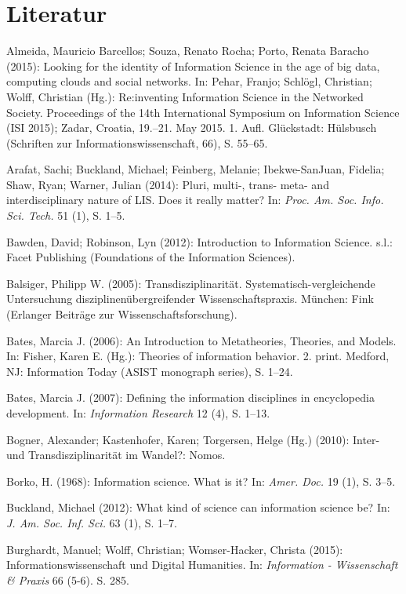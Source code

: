 \documentclass[a4paper,
fontsize=11pt,
oneside,
numbers=noperiodatend,
parskip=half-,
bibliography=totoc,
final
]{scrartcl}
\begin{document}
\section*{Literatur}\label{literatur}

Almeida, Mauricio Barcellos; Souza, Renato Rocha; Porto, Renata Baracho
(2015): Looking for the identity of Information Science in the age of
big data, computing clouds and social networks. In: Pehar, Franjo;
Schlögl, Christian; Wolff, Christian (Hg.): Re:inventing Information
Science in the Networked Society. Proceedings of the 14th International
Symposium on Information Science (ISI 2015); Zadar, Croatia, 19.--21.
May 2015. 1. Aufl. Glückstadt: Hülsbusch (Schriften zur
Informationswissenschaft, 66), S. 55--65.

Arafat, Sachi; Buckland, Michael; Feinberg, Melanie; Ibekwe-SanJuan,
Fidelia; Shaw, Ryan; Warner, Julian (2014): Pluri, multi-, trans- meta-
and interdisciplinary nature of LIS. Does it really matter? In:
\emph{Proc. Am. Soc. Info. Sci. Tech.} 51 (1), S. 1--5.

Bawden, David; Robinson, Lyn (2012): Introduction to Information
Science. s.l.: Facet Publishing (Foundations of the Information
Sciences).

Balsiger, Philipp W. (2005): Transdisziplinarität.
Systematisch-vergleichende Untersuchung disziplinenübergreifender
Wissenschaftspraxis. München: Fink (Erlanger Beiträge zur
Wissenschaftsforschung).

Bates, Marcia J. (2006): An Introduction to Metatheories, Theories, and
Models. In: Fisher, Karen E. (Hg.): Theories of information behavior. 2.
print. Medford, NJ: Information Today (ASIST monograph series), S.
1--24.

Bates, Marcia J. (2007): Defining the information disciplines in
encyclopedia development. In: \emph{Information Research} 12 (4), S.
1--13.

Bogner, Alexander; Kastenhofer, Karen; Torgersen, Helge (Hg.) (2010):
Inter- und Transdisziplinarität im Wandel?: Nomos.

Borko, H. (1968): Information science. What is it? In: \emph{Amer. Doc.}
19 (1), S. 3--5.

Buckland, Michael (2012): What kind of science can information science
be? In: \emph{J. Am. Soc. Inf. Sci.} 63 (1), S. 1--7.

Burghardt, Manuel; Wolff, Christian; Womser-Hacker, Christa (2015):
Informationswissenschaft und Digital Humanities. In: \emph{Information -
Wissenschaft \& Praxis} 66 (5-6). S. 285.
\end{document}

